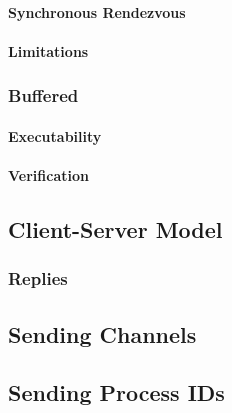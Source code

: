 \documentclass[a4paper, 11pt, accentcolor = tud3b]{tudreport}
\begin{document}
                    \paragraph{Synchronous Rendezvous} %

                    \paragraph{Limitations} %

                \subsubsection{Buffered} %

                    \paragraph{Executability} %

                    \paragraph{Verification} %

            \subsection{Client-Server Model} %

                \subsubsection{Replies} %

            \subsection{Sending Channels} %

            \subsection{Sending Process IDs} %
\end{document}
